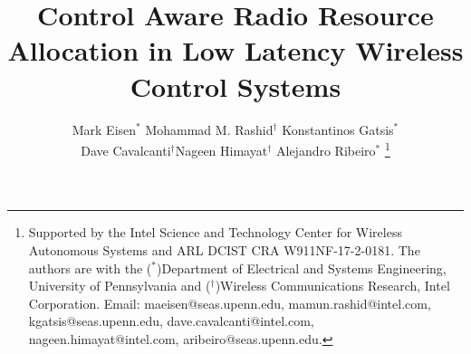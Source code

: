 \documentclass[journal]{IEEEtran}
\title{Control Aware Radio Resource Allocation in Low Latency Wireless Control Systems}
\author{Mark Eisen$^*$ \quad Mohammad M. Rashid$^\dagger$ \quad Konstantinos Gatsis$^*$ \\ \textup{Dave Cavalcanti$^\dagger$\quad Nageen Himayat$^{\dagger}$ \quad Alejandro Ribeiro$^*$}
\thanks{Supported by the Intel Science and Technology Center for Wireless Autonomous Systems and ARL DCIST CRA W911NF-17-2-0181. The authors are with the ($^*$)Department of Electrical and Systems Engineering, University of Pennsylvania and ($^\dagger$)Wireless Communications Research, Intel Corporation. Email: maeisen@seas.upenn.edu, mamun.rashid@intel.com, kgatsis@seas.upenn.edu, dave.cavalcanti@intel.com, nageen.himayat@intel.com, aribeiro@seas.upenn.edu.}}
\begin{document}
\thispagestyle{empty}
\maketitle

%
\begin{abstract}

\end{abstract}
\end{document}
